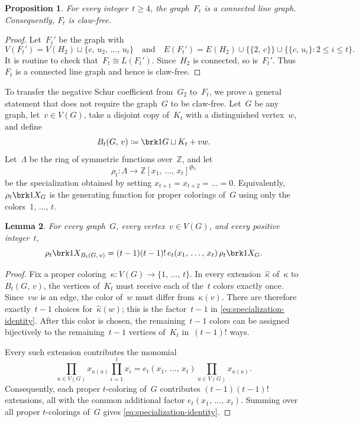 \documentclass[11pt]{amsart}
\numberwithin{equation}{section}
\newtheorem{lemma}{Lemma}[section]
\newtheorem{proposition}[lemma]{Proposition}
\theoremstyle{remark}
\newcommand{\CSF}{X}
\newcommand{\Gtwo}{G_{2}}
\newcommand{\Ft}{F_t}
\newcommand{\Bt}{B_t(G,\,v)}
\begin{document}
\begin{proposition}\label{prop:line-graph}
For every integer~$t\ge 4$, the graph~$\Ft$ is a connected line graph.
Consequently, $\Ft$ is claw-free.
\end{proposition}

\begin{proof}
Let~$\Ft'$ be the graph with
\[
V(\Ft')=V(H_2)\sqcup\{c,\,u_2,\,\dots,\,u_t\}
\quad\text{and}\quad
E(\Ft')=E(H_2)\cup\{\{2,\,c\}\}
\cup\bigl\{\{c,\,u_i\}\colon 2\le i\le t\bigr\}.
\]
It is routine to check that~$\Ft\cong L(\Ft')$.  Since~$H_2$ is connected,
so is~$\Ft'$.  Thus~$\Ft$ is a connected line graph and hence is claw-free.
\end{proof}





To transfer the negative Schur coefficient from~$\Gtwo$ to~$\Ft$, we prove
a general statement that does not require the graph~$G$ to be claw-free.
Let~$G$ be any graph, let~$v\in V(G)$, take a disjoint copy of~$K_t$ with a
distinguished vertex~$w$, and define
\[
\Bt\coloneqq\brk1{G\sqcup K_t}+vw.
\]
Let~$\Lambda$ be the ring of symmetric functions over~$\mathbb Z$, and let
\[
\rho_t\colon\Lambda\longrightarrow
\mathbb Z[x_1,\,\dots,\,x_t]^{\mathfrak S_t}
\]
be the specialization obtained by setting $x_{t+1}=x_{t+2}=\dots=0$.
Equivalently, $\rho_t\brk1{\CSF_G}$ is the generating function for proper
colorings of~$G$ using only the colors~$1,\,\dots,\,t$.

\begin{lemma}\label{lem:specialization}
For every graph~$G$, every vertex~$v\in V(G)$, and every positive
integer~$t$,
\begin{equation}\label{eq:specialization-identity}
\rho_t\brk1{\CSF_{\Bt}}
=(t-1)(t-1)!\,e_t(x_1,\,\dots,\,x_t)\,
\rho_t\brk1{\CSF_G}.
\end{equation}
\end{lemma}

\begin{proof}
Fix a proper coloring~$\kappa\colon V(G)\to\{1,\,\dots,\,t\}$.  In every
extension~$\widehat\kappa$ of~$\kappa$ to~$\Bt$, the vertices of~$K_t$ must
receive each of the~$t$ colors exactly once.
Since~$vw$ is an edge, the color of~$w$ must differ from~$\kappa(v)$.
There are therefore exactly~$t-1$ choices for~$\widehat\kappa(w)$; this is
the factor~$t-1$ in \cref{eq:specialization-identity}.  After this color is
chosen, the remaining~$t-1$ colors can be assigned bijectively to the
remaining~$t-1$ vertices of~$K_t$ in~$(t-1)!$ ways.

Every such extension contributes the monomial
\[
\prod_{u\in V(G)}x_{\kappa(u)}\prod_{i=1}^t x_i
=e_t(x_1,\,\dots,\,x_t)\prod_{u\in V(G)}x_{\kappa(u)}.
\]
Consequently, each proper $t$-coloring of~$G$ contributes
$(t-1)(t-1)!$ extensions, all with the common additional factor
$e_t(x_1,\,\dots,\,x_t)$.  Summing over all proper $t$-colorings
of~$G$ gives \cref{eq:specialization-identity}.
\end{proof}
\end{document}
